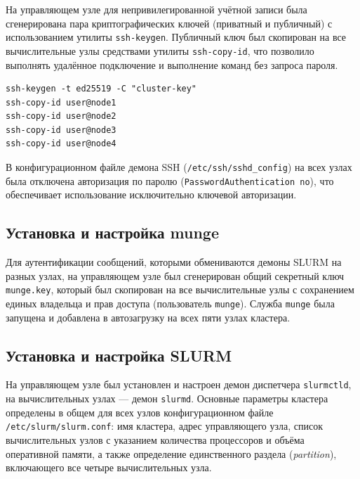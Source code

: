На управляющем узле для непривилегированной учётной записи была
сгенерирована пара криптографических ключей (приватный и публичный)
с использованием утилиты \texttt{ssh-keygen}. Публичный ключ был
скопирован на все вычислительные узлы средствами утилиты
\texttt{ssh-copy-id}, что позволило выполнять удалённое подключение и
выполнение команд без запроса пароля.

\begin{lstlisting}[caption={Генерация и распространение ключей SSH}]
ssh-keygen -t ed25519 -C "cluster-key"
ssh-copy-id user@node1
ssh-copy-id user@node2
ssh-copy-id user@node3
ssh-copy-id user@node4
\end{lstlisting}

В конфигурационном файле демона SSH (\texttt{/etc/ssh/sshd\_config})
на всех узлах была отключена авторизация по паролю
(\texttt{PasswordAuthentication no}), что обеспечивает использование
исключительно ключевой авторизации.

\subsection{Установка и настройка munge}

Для аутентификации сообщений, которыми обмениваются демоны SLURM на
разных узлах, на управляющем узле был сгенерирован общий
секретный ключ \texttt{munge.key}, который был скопирован на все
вычислительные узлы с сохранением единых владельца и прав доступа
(пользователь \texttt{munge}). Служба \texttt{munge} была запущена и
добавлена в автозагрузку на всех пяти узлах кластера.


\subsection{Установка и настройка SLURM}

На управляющем узле был установлен и настроен демон диспетчера
\texttt{slurmctld}, на вычислительных узлах — демон
\texttt{slurmd}. Основные параметры кластера определены в общем для
всех узлов конфигурационном файле \texttt{/etc/slurm/slurm.conf}:
имя кластера, адрес управляющего узла, список вычислительных узлов с
указанием количества процессоров и объёма оперативной памяти, а
также определение единственного раздела (\textit{partition}),
включающего все четыре вычислительных узла.

